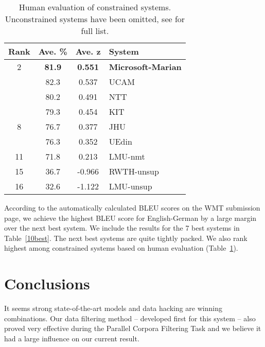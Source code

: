 \documentclass[11pt,a4paper]{article}
\begin{document}
\begin{table}[t]
  \centering
\begin{tabular}{cccl}\toprule
Rank & Ave. \% & Ave. z & System \\ \midrule
2 \bf   & \bf81.9	& \bf 0.551 &\sc\bf Microsoft-Marian \\
   & 82.3	& 0.537 & \sc UCAM \\
   & 80.2	& 0.491 & \sc NTT \\
   & 79.3	& 0.454 & \sc KIT \\\midrule
8   & 76.7	& 0.377 & \sc JHU \\
   & 76.3	& 0.352 & \sc UEdin \\ \midrule
11 & 71.8	& 0.213 & \sc LMU-nmt \\ \midrule
15 & 36.7	& -0.966 & \sc RWTH-unsup \\ \midrule
16 & 32.6	& -1.122 & \sc LMU-unsup \\ \bottomrule
\end{tabular}
  \caption{Human evaluation of constrained systems. Unconstrained systems have been omitted, see  for full list.}
  \label{human}
  \end{table}

According to the automatically calculated BLEU scores on the WMT submission page, we achieve the highest BLEU score for English-German by a large margin over the next best system. We include the results for the 7 best systems in Table~\ref{10best}. The next best systems are quite tightly packed.
We also rank highest among constrained systems based on human evaluation (Table~\ref{human}).

\section{Conclusions}

It seems strong state-of-the-art models and data hacking are winning combinations. 
Our data filtering method -- developed first for this system -- also proved very effective during the Parallel Corpora Filtering Task and we believe it had a large influence on our current result. %



\end{document}
